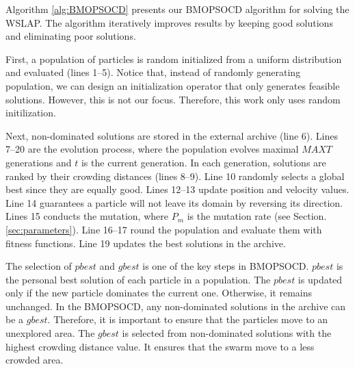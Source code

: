 \documentclass[10pt,journal,compsoc]{IEEEtran}
\begin{document}
Algorithm \ref{alg:BMOPSOCD} presents our BMOPSOCD algorithm for solving the WSLAP. The algorithm iteratively improves results by keeping good solutions and eliminating poor solutions.

First, a population of particles is random initialized from a uniform distribution and evaluated (lines 1--5). Notice that, instead of randomly generating population, we can design an initialization operator that only generates feasible solutions. However, this is not our focus. Therefore, this work only uses random initilization.

Next, non-dominated solutions are stored in the external archive (line 6). Lines 7--20 are the evolution process, where the population evolves maximal $MAXT$ generations and $t$ is the current generation. In each generation, solutions are ranked by their crowding distances (lines 8--9). Line 10 randomly selects a global best since they are equally good. Lines 12--13 update position and velocity values. Line 14 guarantees a particle will not leave its domain by reversing its direction. Lines 15 conducts the mutation, where $P_m$ is the mutation rate (see Section. \ref{sec:parameters}). Line 16--17 round the population and evaluate them with fitness functions. Line 19 updates the best solutions in the archive.

The selection of $pbest$ and $gbest$ is one of the key steps in BMOPSOCD. $pbest$ is the personal best solution of each particle in a population. The $pbest$ is updated only if the new particle dominates the current one. Otherwise, it remains unchanged. In the BMOPSOCD, any non-dominated solutions in the archive can be a $gbest$. Therefore, it is important to ensure that the particles move to an unexplored area. The $gbest$ is selected from non-dominated solutions with the highest crowding distance value. It ensures that the swarm move to a less crowded area.
\end{document}
